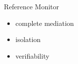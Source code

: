 \documentclass{beamer}
\begin{document}
\begin{frame}{Reference Monitor}
  \begin{itemize}
  \item complete mediation
  \item isolation
  \item verifiability
  \end{itemize}
  \begin{center}
  \end{center}
\end{frame}
\end{document}
